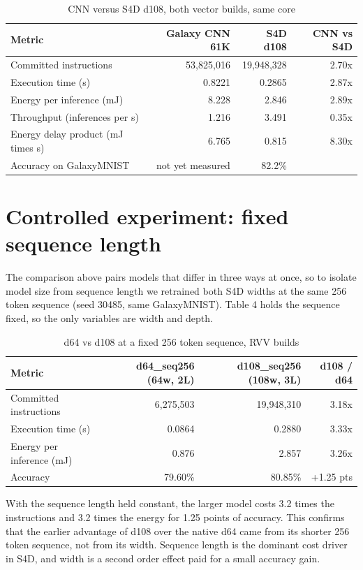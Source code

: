 \documentclass[11pt]{article}
\begin{document}
\begin{table}[h]
\centering
\caption{CNN versus S4D d108, both vector builds, same core}
\begin{tabular}{lrrr}
\toprule
Metric & Galaxy CNN 61K & S4D d108 & CNN vs S4D \\
\midrule
Committed instructions & 53{,}825{,}016 & 19{,}948{,}328 & 2.70x \\
Execution time (s)     & 0.8221 & 0.2865 & 2.87x \\
Energy per inference (mJ) & 8.228 & 2.846 & 2.89x \\
Throughput (inferences per s) & 1.216 & 3.491 & 0.35x \\
Energy delay product (mJ times s) & 6.765 & 0.815 & 8.30x \\
Accuracy on GalaxyMNIST & not yet measured & 82.2\% & \\
\bottomrule
\end{tabular}
\end{table}

\section{Controlled experiment: fixed sequence length}

The comparison above pairs models that differ in three ways at once, so to
isolate model size from sequence length we retrained both S4D widths at the
same 256 token sequence (seed 30485, same GalaxyMNIST). Table 4 holds the
sequence fixed, so the only variables are width and depth.

\begin{table}[h]
\centering
\caption{d64 vs d108 at a fixed 256 token sequence, RVV builds}
\begin{tabular}{lrrr}
\toprule
Metric & d64\_seq256 (64w, 2L) & d108\_seq256 (108w, 3L) & d108 / d64 \\
\midrule
Committed instructions & 6{,}275{,}503 & 19{,}948{,}310 & 3.18x \\
Execution time (s) & 0.0864 & 0.2880 & 3.33x \\
Energy per inference (mJ) & 0.876 & 2.857 & 3.26x \\
Accuracy & 79.60\% & 80.85\% & +1.25 pts \\
\bottomrule
\end{tabular}
\end{table}

With the sequence length held constant, the larger model costs 3.2 times the
instructions and 3.2 times the energy for 1.25 points of accuracy. This confirms
that the earlier advantage of d108 over the native d64 came from its shorter 256
token sequence, not from its width. Sequence length is the dominant cost driver
in S4D, and width is a second order effect paid for a small accuracy gain.
\end{document}
